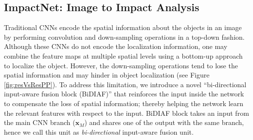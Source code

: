 \documentclass[10pt,twocolumn,letterpaper]{article}
\begin{document}
\subsection{ImpactNet: Image to Impact Analysis}
Traditional CNNs encode the spatial information about the objects in an image by performing convolution and down-sampling operations in a top-down fashion. Although these CNNs do not encode the localization information, one may combine the feature maps at multiple spatial levels using a bottom-up approach to localize the object. However, the down-sampling operations tend to lose the spatial information and may hinder in object localization (see Figure \ref{fig:resVsResPP}). To address this limitation, we introduce a novel ``bi-directional input-aware fusion block (BiDIAF)'' that reinforces the input inside the network to compensate the loss of spatial information; thereby helping the network learn the relevant features with respect to the input. BiDIAF block takes an input from the main CNN branch ($\mathbf{x}_M$) and shares one of the output with the same branch, hence we call this unit as \textit{bi-directional} input-aware fusion unit.
\end{document}
